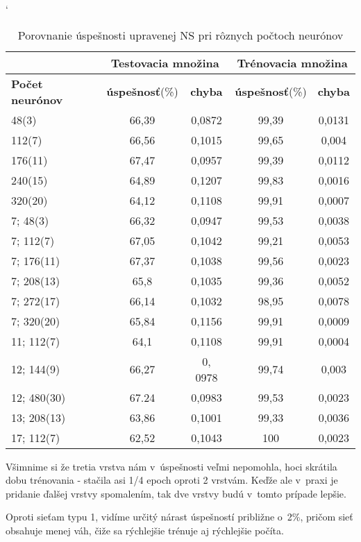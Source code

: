 \begin{table}[htp]
\catcode` %
\centering
\begin{tabular}{|l|c|c|c|c|}
\cline{2-5}
\multicolumn{1}{l}{} & \multicolumn{2}{|c|}{\textbf{Testovacia množina}} & \multicolumn{2}{c|}{\textbf{Trénovacia množina}}\\ 
\hline
\textbf{Počet neurónov} & \textbf{úspešnosť}(\%) & \textbf{chyba} & \textbf{úspešnosť}(\%) & \textbf{chyba} \\ \hline
48(3)& 66,39 & 0,0872 & 99,39 & 0,0131 \\ \hline
112(7)& 66,56 & 0,1015 & 99,65 & 0,004 \\ \hline 
176(11)& 67,47 & 0,0957 & 99,39 & 0,0112 \\ \hline
240(15)& 64,89 & 0,1207 & 99,83 & 0,0016 \\ \hline
320(20)& 64,12 & 0,1108 & 99,91 & 0,0007 \\ \hline
7; 48(3)& 66,32 & 0,0947 & 99,53 & 0,0038 \\ \hline 
7; 112(7)& 67,05 & 0,1042 & 99,21 & 0,0053 \\ \hline 
7; 176(11)& 67,37 & 0,1038 & 99,56 & 0,0023 \\ \hline
7; 208(13)& 65,8  & 0,1035 & 99,36 & 0,0052 \\ \hline 
7; 272(17)& 66,14 & 0,1032 & 98,95 & 0,0078 \\ \hline 
7; 320(20)& 65,84& 0,1156 & 99,91 & 0,0009\\ \hline 
11; 112(7)& 64,1 & 0,1108 & 99,91 & 0,0004 \\ \hline
12; 144(9)& 66,27 & 0, 0978 & 99,74 & 0,003 \\ \hline
12; 480(30)& 67.24 & 0,0983 & 99,53 & 0,0023 \\ \hline 
13; 208(13)& 63,86 & 0,1001 & 99,33 & 0,0036 \\ \hline 
17; 112(7)& 62,52 & 0,1043 & 100 & 0,0023 \\ \hline
\end{tabular}
\caption{Porovnanie úspešnosti upravenej NS pri rôznych počtoch neurónov}
\label{tab:neuroncountcmp2}
\end{table}

Všimnime si že tretia vrstva nám v~úspešnosti veľmi nepomohla, hoci skrátila dobu trénovania - stačila asi 1/4 epoch oproti 2 vrstvám. Keďže ale v~praxi je pridanie ďalšej vrstvy spomalením, tak dve vrstvy budú v~tomto prípade lepšie.

Oproti sieťam typu 1, vidíme určitý nárast úspešností približne o~2\%, pričom sieť obsahuje menej váh, čiže sa rýchlejšie trénuje aj rýchlejšie počíta.

